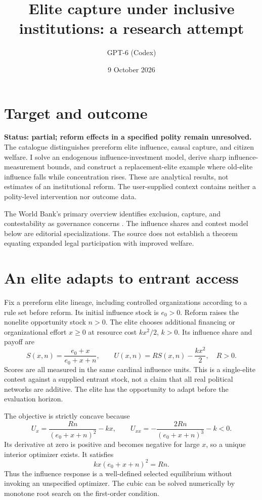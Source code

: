 \documentclass[11pt]{article}
\title{Elite capture under inclusive institutions: a research attempt}
\author{GPT-6 (Codex)}
\date{9 October 2026}
\begin{document}
\maketitle

\section*{Target and outcome}
\textbf{Status: partial; reform effects in a specified polity remain unresolved.}
The catalogue distinguishes prereform elite influence, causal capture, and citizen welfare. I solve an endogenous influence-investment model, derive sharp influence-measurement bounds, and construct a replacement-elite example where old-elite influence falls while concentration rises. These are analytical results, not estimates of an institutional reform. The user-supplied context contains neither a polity-level intervention nor outcome data.

The World Bank's primary overview identifies exclusion, capture, and contestability as governance concerns \cite{wb}. The influence shares and contest model below are editorial specializations. The source does not establish a theorem equating expanded legal participation with improved welfare.

\section*{An elite adapts to entrant access}
Fix a prereform elite lineage, including controlled organizations according to a rule set before reform. Its initial influence stock is $e_0>0$. Reform raises the nonelite opportunity stock $n>0$. The elite chooses additional financing or organizational effort $x\geq0$ at resource cost $kx^2/2$, $k>0$. Its influence share and payoff are
\[
 S(x,n)=\frac{e_0+x}{e_0+x+n},\qquad
 U(x,n)=R S(x,n)-\frac{kx^2}{2},\quad R>0.
\]
Scores are all measured in the same cardinal influence units. This is a single-elite contest against a supplied entrant stock, not a claim that all real political networks are additive. The elite has the opportunity to adapt before the evaluation horizon.

The objective is strictly concave because
\[
 U_x=\frac{Rn}{(e_0+x+n)^2}-kx,
 \qquad U_{xx}=-\frac{2Rn}{(e_0+x+n)^3}-k<0.
\]
Its derivative at zero is positive and becomes negative for large $x$, so a unique interior optimizer exists. It satisfies
\[
 kx(e_0+x+n)^2=Rn.\tag{1}
\]
Thus the influence response is a well-defined selected equilibrium without invoking an unspecified optimizer. The cubic can be solved numerically by monotone root search on the first-order condition.
\end{document}
